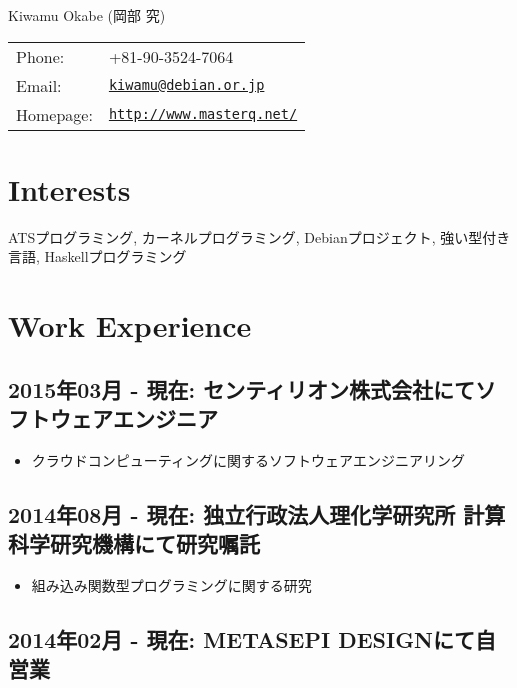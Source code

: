 \documentclass[letterpaper]{article}
\def\name{Kiwamu Okabe (岡部 究)}
\begin{document}
{\huge \name}


\vspace{0.25in}

\begin{minipage}{0.3\linewidth}
  \begin{tabular}{ll}
    Phone: & +81-90-3524-7064 \\
    Email: & \href{mailto:kiwamu@debian.or.jp}{\tt kiwamu@debian.or.jp} \\
    Homepage: & \href{http://www.masterq.net/}{\tt http://www.masterq.net/} \\
  \end{tabular}
\end{minipage}

\section*{Interests}

ATSプログラミング, カーネルプログラミング, Debianプロジェクト, 強い型付き言語, Haskellプログラミング

\section*{Work Experience}
\subsection*{2015年03月 - 現在: センティリオン株式会社にてソフトウェアエンジニア}

\begin{itemize}
  \item クラウドコンピューティングに関するソフトウェアエンジニアリング
\end{itemize}

\subsection*{2014年08月 - 現在: 独立行政法人理化学研究所 計算科学研究機構にて研究嘱託}

\begin{itemize}
  \item 組み込み関数型プログラミングに関する研究
\end{itemize}

\subsection*{2014年02月 - 現在: METASEPI DESIGNにて自営業}
\end{document}
